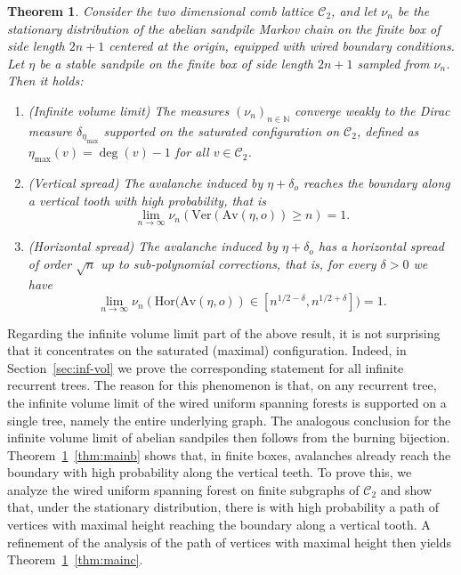 \documentclass[11pt]{article}
\newtheorem{theorem}{Theorem}[section]
\newcommand{\N}{\mathbb{N}}
\begin{document}
\begin{theorem}\label{thm:main}
    Consider the two dimensional comb lattice $\mathcal{C}_2$, and let $\nu_n$ be the stationary distribution of the abelian sandpile Markov chain on the finite box of side length $2n+1$ centered at the origin, equipped with wired boundary conditions.  Let $\eta$ be a stable sandpile on the finite box of side length $2n+1$ sampled from $\nu_n$. Then it holds:
    \begin{enumerate}[label=(\alph*)]
    \setlength\itemsep{0em}
        \item\label{thm:maina} (Infinite volume limit) The measures $(\nu_n)_{n\in\N}$ converge weakly to the Dirac measure $\delta_{\eta_\text{max}}$ supported on the saturated configuration on $\mathcal{C}_2$, defined as $\eta_{\text{max}}(v)=\deg(v)-1$ for all $v\in\mathcal{C}_2$.
        \item\label{thm:mainb} (Vertical spread) The avalanche induced by $\eta+\delta_o$ reaches the boundary along a
        vertical tooth with high probability, that is
        $$\lim_{n\rightarrow\infty}\nu_n(\text{Ver}(\text{Av}(\eta,o))\geq n)=1.$$
        \item\label{thm:mainc} (Horizontal spread) The avalanche induced by $\eta+\delta_o$ has a horizontal spread of order $\sqrt{n}$ up to sub-polynomial corrections, that is, for every $\delta>0$ we have
        $$\lim_{n\rightarrow\infty}\nu_n(\text{Hor}\big(\text{Av}(\eta,o))\in[n^{1/2-\delta},n^{1/2+\delta}]\big)=1.$$
    \end{enumerate}
\end{theorem}
Regarding the infinite volume limit part of the above result, it is not surprising that it concentrates on the saturated (maximal) configuration. Indeed, in Section~\ref{sec:inf-vol} we prove the corresponding statement for all infinite recurrent trees. The reason for this phenomenon is that, on any recurrent tree, the infinite volume limit of the wired uniform spanning forests is supported on a single tree, namely the entire underlying graph. The analogous conclusion for the infinite volume limit of abelian sandpiles then follows from the burning bijection.
Theorem~\ref{thm:main}~\ref{thm:mainb} shows that, in finite boxes, avalanches already reach the boundary with high probability along the vertical teeth. To prove this, we analyze the wired uniform spanning forest on finite subgraphs of $\mathcal{C}_2 $ and show that, under the stationary distribution, there is with high probability a path of vertices with maximal height reaching the boundary along a vertical tooth. A refinement of the analysis of the path of vertices with maximal height then yields Theorem~\ref{thm:main}~\ref{thm:mainc}.
\end{document}
